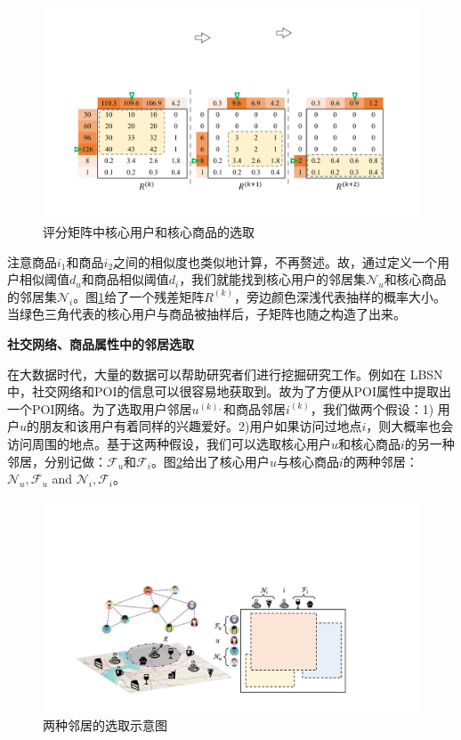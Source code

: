 \begin{figure}[t!]
\includegraphics[width=\textwidth]{pics/MF.pdf}
\caption{评分矩阵中核心用户和核心商品的选取} \label{MF}
\end{figure}
\noindent 注意商品$i_1$和商品$i_2$之间的相似度也类似地计算，不再赘述。故，通过定义一个用户相似阈值$d_u$和商品相似阈值$d_i$，我们就能找到核心用户的邻居集$\mathcal{N}_u$和核心商品的邻居集$\mathcal{N}_i$。图\ref{MF}给了一个残差矩阵$R^{(k)}$，旁边颜色深浅代表抽样的概率大小。当绿色三角代表的核心用户与商品被抽样后，子矩阵也随之构造了出来。

\vspace{3mm}
\noindent\textbf{社交网络、商品属性中的邻居选取}

在大数据时代，大量的数据可以帮助研究者们进行挖掘研究工作。例如在 LBSN中，社交网络和POI的信息可以很容易地获取到。故为了方便从POI属性中提取出一个POI网络。为了选取用户邻居$u^{(k),}$和商品邻居$i^{(k)}$，我们做两个假设：1) 用户$u$的朋友和该用户有着同样的兴趣爱好。2)用户如果访问过地点$i$，则大概率也会访问周围的地点。基于这两种假设，我们可以选取核心用户$u$和核心商品$i$的另一种邻居，分别记做：$\mathcal{F}_u$和$\mathcal{F}_i$。图\ref{BLOMA}给出了核心用户$u$与核心商品$i$的两种邻居：$\mathcal{N}_u, \mathcal{F}_u$ and $\mathcal{N}_i, \mathcal{F}_i$。



\begin{figure}[t!]
\includegraphics[width=\textwidth]{pics/BLOMA.pdf}
\caption{两种邻居的选取示意图} 
\label{BLOMA}
\end{figure}
